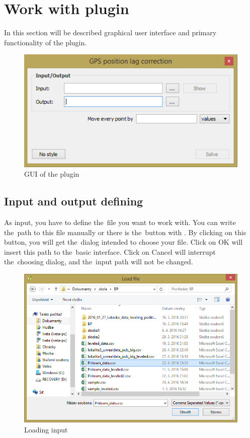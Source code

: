 \section{Work with plugin}
\label{work}

In this section will be described graphical user interface and primary functionality of the plugin. 

  \begin{figure}[H]
   \centering
	\includegraphics[scale=0.75]{./pictures/gui.png}
	\caption[GUI]{GUI of the plugin}
      \label{fig:gui}
  \end{figure}

\subsection{Input and output defining}
\label{input-output}

As input, you have to define the~file you want to work
with. You can write the~path to this file manually or
there is the~button with . By clicking
on this button, you will get the~dialog intended to
choose your file. Click on OK will insert this path
to the~basic interface. Click
on Cancel will interrupt the~choosing dialog,
and the~input path will not be changed. 

  \begin{figure}[H]
   \centering
	\includegraphics[scale=0.75]{./pictures/input.png}
	\caption[Loading input]{Loading input}
      \label{fig:input}
  \end{figure}

